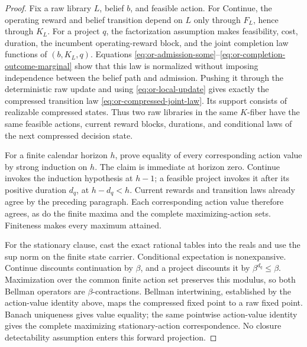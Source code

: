 \begin{proof}
Fix a raw library $L$, belief $b$, and feasible action. For Continue,
the operating reward and belief transition depend on $L$ only through
$F_L$, hence through $K_L$. For a project $q$, the factorization
assumption makes feasibility, cost, duration, the incumbent operating-reward
block, and the joint completion law functions of $(b,K_L,q)$. Equations
\eqref{eq:or-admission-some}--\eqref{eq:or-completion-outcome-marginal}
show that this law is normalized without imposing independence between the
belief path and admission. Pushing it through the deterministic raw update
and using \eqref{eq:or-local-update} gives exactly the compressed transition
law \eqref{eq:or-compressed-joint-law}. Its support consists of realizable
compressed states. Thus two raw libraries in the same $K$-fiber have the
same feasible actions, current reward blocks, durations, and conditional laws
of the next compressed decision state.

For a finite calendar horizon $h$, prove equality of every corresponding
action value by strong induction on $h$. The claim is immediate at horizon
zero. Continue invokes the induction hypothesis at $h-1$; a feasible
project invokes it after its positive duration $d_q$, at $h-d_q<h$.
Current rewards and transition laws already agree by the preceding paragraph.
Each corresponding action value therefore agrees, as do the finite maxima and
the complete maximizing-action sets. Finiteness makes every maximum attained.

For the stationary clause, cast the exact rational tables into the reals and
use the sup norm on the finite state carrier. Conditional expectation is
nonexpansive. Continue discounts continuation by $\beta$, and a project
discounts it by $\beta^{d_q}\leq\beta$. Maximization over the common finite
action set preserves this modulus, so both Bellman operators are
$\beta$-contractions. Bellman intertwining, established by the action-value
identity above, maps the compressed fixed point to a raw fixed point. Banach
uniqueness gives value equality; the same pointwise action-value identity gives
the complete maximizing stationary-action correspondence. No closure
detectability assumption enters this forward projection.
\end{proof}
